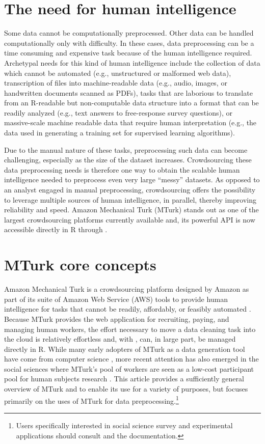 \section{The need for human intelligence}
Some data cannot be computationally preprocessed. Other data can be handled computationally only with difficulty. In these cases, data preprocessing can be a time consuming and expensive task because of the human intelligence required. Archetypal needs for this kind of human intelligence include the collection of data which cannot be automated (e.g., unstructured or malformed web data), transcription of files into machine-readable data (e.g., audio, images, or handwritten documents scanned as PDFs), tasks that are laborious to translate from an R-readable but non-computable data structure into a format that can be readily analyzed (e.g., text answers to free-response survey questions), or massive-scale machine readable data that require human interpretation (e.g., the data used in generating a training set for supervised learning algorithms).

Due to the manual nature of these tasks, preprocessing such data can become challenging, especially as the size of the dataset increases. Crowdsourcing these data preprocessing needs is therefore one way to obtain the scalable human intelligence needed to preprocess even very large ``messy'' datasets. As opposed to an analyst engaged in manual preprocessing, crowdsourcing offers the possibility to leverage multiple sources of human intelligence, in parallel, thereby improving reliability and speed. Amazon Mechanical Turk (MTurk) stands out as one of the largest crowdsourcing platforms currently available and, its powerful API is now accessible directly in R through .

\section{MTurk core concepts}
Amazon Mechanical Turk is a crowdsourcing platform designed by Amazon as part of its suite of Amazon Web Service (AWS) tools to provide human intelligence for tasks that cannot be readily, affordably, or feasibly automated \citep{Amazon2012}. Because MTurk provides the web application for recruiting, paying, and managing human workers, the effort necessary to move a data cleaning task into the cloud is relatively effortless and, with , can, in large part, be managed directly in R. While many early adopters of MTurk as a data generation tool have come from computer science \citep{MasonSuri2011, KitturChiSuh2008}, more recent attention has also emerged in the social sciences where MTurk's pool of workers are seen as a low-cost participant pool for human subjects research \citep{BuhrmesterKwangGosling2011, BerinskyHuberLenz2010, PaolacciChandlerStern2010}. This article provides a sufficiently general overview of MTurk and  to enable its use for a variety of purposes, but focuses primarily on the uses of MTurk for data preprocessing.\footnote{Users specifically interested in social science survey and experimental applications should consult \citet{Leeper2013a} and the  documentation.}

